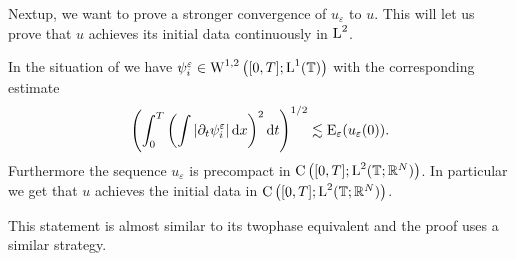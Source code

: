 Nextup, we want to prove a stronger convergence of $ u_{ \varepsilon } $ to $ u 
$. This will let us prove that $ u $ achieves its initial data continuously in 
$ \operatorname{L}^{ 2 } $.

\begin{lemma}
	\label{continuity_in_l2_and_initial_data_multiphase}
	In the situation of  we have 
	$ \psi_{ i }^{ \varepsilon } \in \operatorname{W}^{ 1 , 2 } \left(
		[ 0 , T ] ; \operatorname{L}^{ 1 } ( \operatorname{\mathbb{T}} )
	\right)
	$
	with the corresponding estimate
	\begin{equation}
		\label{l2_estimate_on_partial_t_psi_i}
		\left(
			\int_{ 0 }^{ T }
				\left(
					\int
						\abs{ \partial_{ t } \psi_{ i }^{ \varepsilon } }
					\dd{ x }
				\right)^{ 2 }
			\dd{ t }
		\right)^{ 1/2 }
		\lesssim
		\operatorname{E}_{ \varepsilon } ( u_{ \varepsilon } ( 0 ) ).
	\end{equation}
	Furthermore the sequence $ u_{ \varepsilon } $ is precompact in 
	$ \operatorname{C} \left(
		[ 0 , T ] ; \operatorname{L}^{ 2 } ( \operatorname{\mathbb{T}} ; \mathbb{ R }^{ N } )
	\right) $.
	In particular we get that $ u $ achieves the initial data in 
	$ \operatorname{C} \left( [ 0 , T ] ; \operatorname{L}^{ 2 } ( \operatorname{\mathbb{T}} ; \mathbb{ R }^{ N } )
	\right) $.
\end{lemma}

\begin{remark}
	This statement is almost similar to its twophase equivalent  and the proof uses a similar strategy.
\end{remark}

